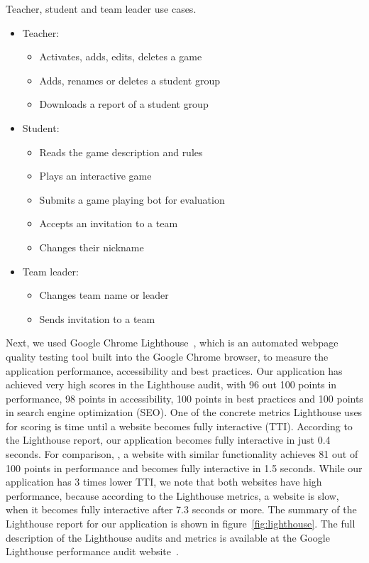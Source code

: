 \begin{mylist}
\caption{Teacher, student and team leader use cases.}
\label{lst:use_cases}
\begin{itemize}
\item Teacher:
    \begin{itemize}
    \item Activates, adds, edits, deletes a game
    \item Adds, renames or deletes a student group
    \item Downloads a report of a student group
    \end{itemize}
    
\item Student:
    \begin{itemize}
    \item Reads the game description and rules
    \item Plays an interactive game
    \item Submits a game playing bot for evaluation
    \item Accepts an invitation to a team 
    \item Changes their nickname
    \end{itemize}

\item Team leader:
    \begin{itemize}
    \item Changes team name or leader
    \item Sends invitation to a team
    \end{itemize}
\end{itemize}
\end{mylist}

Next, we used Google Chrome Lighthouse~\cite{Lighthouse}, which is an automated webpage quality testing tool built into the Google Chrome browser, to measure the application performance, accessibility and best practices. Our application has achieved very high scores in the Lighthouse audit, with 96 out 100 points in performance, 98 points in accessibility, 100 points in best practices and 100 points in search engine optimization (SEO). One of the concrete metrics Lighthouse uses for scoring is time until a website becomes fully interactive (TTI). According to the Lighthouse report, our application becomes fully interactive in just 0.4 seconds. For comparison, , a website with similar functionality achieves 81 out of 100 points in performance and becomes fully interactive in 1.5 seconds. While our application has 3 times lower TTI, we note that both websites have high performance, because according to the Lighthouse metrics, a website is slow, when it becomes fully interactive after 7.3 seconds or more. The summary of the Lighthouse report for our application is shown in figure~\ref{fig:lighthouse}. The full description of the Lighthouse audits and metrics is available at the Google Lighthouse performance audit website~\cite{lighthouse_metrics}.

